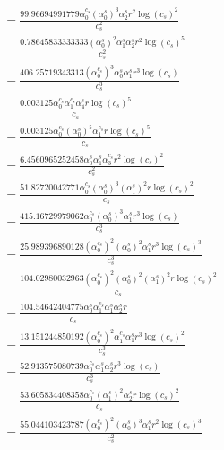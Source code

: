 \documentclass[10pt]{article}
\begin{document}
\begin{align*}
&{}  - \frac{99.96694991779 \alpha_{0}^{c_s} \left(\alpha_{0}^s\right)^{3} \alpha_{2}^s r^{2} \log{\left(c_{s} \right)}^{2}}{c_{s}^{2}} \\
&{}  - \frac{0.78645833333333 \left(\alpha_{0}^s\right)^{2} \alpha_{1}^s \alpha_{2}^s r^{2} \log{\left(c_{s} \right)}^{5}}{c_{s}^{2}} \\
&{}  - \frac{406.25719343313 \left(\alpha_{0}^{c_s}\right)^{3} \alpha_{0}^s \alpha_{1}^s r^{3} \log{\left(c_{s} \right)}}{c_{s}^{3}} \\
&{}  - \frac{0.003125 \alpha_{0}^{c_s} \alpha_{1}^{c_s} \alpha_{4}^s r \log{\left(c_{s} \right)}^{5}}{c_{s}} \\
&{}  - \frac{0.003125 \alpha_{0}^{c_s} \left(\alpha_{0}^s\right)^{5} \alpha_{1}^{c_s} r \log{\left(c_{s} \right)}^{5}}{c_{s}} \\
&{}  - \frac{6.4560965252458 \alpha_{0}^s \alpha_{1}^s \alpha_{3}^{c_s} r^{2} \log{\left(c_{s} \right)}^{2}}{c_{s}^{2}} \\
&{}  - \frac{51.82720042771 \alpha_{0}^{c_s} \left(\alpha_{0}^s\right)^{3} \left(\alpha_{1}^s\right)^{2} r \log{\left(c_{s} \right)}^{2}}{c_{s}} \\
&{}  - \frac{415.16729979062 \alpha_{0}^{c_s} \left(\alpha_{0}^s\right)^{3} \alpha_{1}^s r^{3} \log{\left(c_{s} \right)}}{c_{s}^{3}} \\
&{}  - \frac{25.989396890128 \left(\alpha_{0}^{c_s}\right)^{2} \left(\alpha_{0}^s\right)^{2} \alpha_{1}^s r^{3} \log{\left(c_{s} \right)}^{3}}{c_{s}^{3}} \\
&{}  - \frac{104.02980032963 \left(\alpha_{0}^{c_s}\right)^{2} \left(\alpha_{0}^s\right)^{2} \left(\alpha_{1}^s\right)^{2} r \log{\left(c_{s} \right)}^{2}}{c_{s}} \\
&{}  - \frac{104.54642404775 \alpha_{0}^s \alpha_{1}^{c_s} \alpha_{1}^s \alpha_{2}^s r}{c_{s}} \\
&{}  - \frac{13.151244850192 \left(\alpha_{0}^{c_s}\right)^{2} \alpha_{1}^{c_s} \alpha_{1}^s r^{3} \log{\left(c_{s} \right)}^{2}}{c_{s}^{3}} \\
&{}  - \frac{52.913575080739 \alpha_{0}^{c_s} \alpha_{1}^s \alpha_{2}^s r^{3} \log{\left(c_{s} \right)}}{c_{s}^{3}} \\
&{}  - \frac{53.605834408358 \alpha_{0}^{c_s} \left(\alpha_{1}^s\right)^{2} \alpha_{2}^s r \log{\left(c_{s} \right)}^{2}}{c_{s}} \\
&{}  - \frac{55.044103423787 \left(\alpha_{0}^{c_s}\right)^{2} \left(\alpha_{0}^s\right)^{3} \alpha_{1}^s r^{2} \log{\left(c_{s} \right)}^{3}}{c_{s}^{2}} \\

\end{align*}
\end{document}

